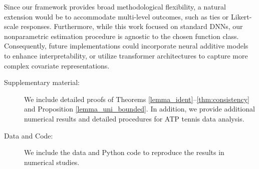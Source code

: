 \documentclass[
  12pt]{article}
\begin{document}
Since our framework provides broad methodological flexibility, a natural extension would be to accommodate multi-level outcomes, such as ties or Likert-scale responses. Furthermore, while this work focused on standard DNNs, our nonparametric estimation procedure is agnostic to the chosen function class. Consequently, future implementations could incorporate neural additive models \citep{agarwal2021neural} to enhance interpretability, or utilize transformer architectures \citep{vaswani2017attention} to capture more complex covariate representations.

\begin{description}
	\item[Supplementary material:] We include detailed proofs of Theorems \ref{lemma_ident}--\ref{thm:consistency} and Proposition \ref{lemma_uni_bounded}. In addition, we provide additional numerical results and detailed procedures for ATP tennis data analysis.
	\vspace{-0.3cm}
	\item[Data and Code:] We include the data and Python code to reproduce the results in numerical studies.
\end{description}



\end{document}
